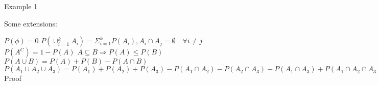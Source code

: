 \documentclass[12 pt]{article}
\newcommand{\cupinfty}[0]{\cup_{i=1}^{\infty}A_i}
\newcommand{\cupinftyup}[1]{\cup_{i=1}^{#1}A_i}
\newcommand{\capinfty}[0]{\cap_{i=1}^{\infty}A_i}
\newcommand{\limitinfty}[0]{\lim_{n \rightarrow \infty}A_n}
\newcommand{\mathcomment}[1]{\qquad\color{blue}{\(#1\)}}
\newcommand{\comment}[1]{}
\begin{document}
			Example 1
			\comment{
			\begin{align} \text{Let } A_k & = \braces{x \mid 1 < x \le 2 - \dfrac{1}{k}} \ A_1 & = \braces{x \mid 1 < x \le 2 - \dfrac{1}{1}} \ A_2 & = \braces{x \mid 1 < x \le 2 - \dfrac{1}{2}} \ & ... \end{align}
			
			Note that the sequence is non-decreasing.
			
			$\limitinfty = \cupinfty = \braces{x \mid 1 < x < 2}$
			
			Note that $x < 2$ is open
			
			Example 2
			
			$A_k = \braces{x \mid 1 < x \le x + \dfrac{1}{k}}$
			
			Note that the sequence is non-increasing.
			
			$\limitinfty = \capinfty = \braces{x \mid 1 < x \le 1} = \emptyset$
			
			Note that $x \le 1$ is still closed.
			
			1.4 Partition & Inequalities
			Partition - sequence of mutually exclusive sets which together form the whole. More formally:
			
			Let $\braces{A_i}_{i = 1}^{\infty (k)}$ be a sequence of sets
			
			$A_i \le \Omega, \forall i$
			
			If $A_i \cap A_j = \emptyset, \forall i \ne j$ and $\cupinftyup{\infty (k)} = \Omega$
			then $\braces{A_i}_{i=1}^{\infty (k)}$ is a partition of sample space $\Omega$
			
			Note - if $B$ is any subset of $\Omega$ & $\braces{A_1, ..., A_k}$ is a partition of $\Omega \Rightarrow B = \cupinftyup{k} (A_i \cap B)$
			
			Theorem 1. Kolmogorov Probability Measure
			Let $F$ be a set that collects possible sets from $\Omega$
			
			P: $F \rightarrow R^+$ is called a probability measure if
			
			a. $P(A) \ge 0 \quad \forall A \in F \mathcomment{\text{non-negative}}$
			b. $P(\Omega) = 1$
			c. $P(\cupinfty) = \Sigma_{i=1}^{\infty} P(A_i), A_i \cap A_j = \emptyset \quad \forall i \ne j$
		}
			Some extensions:
			
			$P(\phi) = 0$
			$P(\cupinftyup{k}) = \Sigma_{i=1}^{k} P(A_i), A_i \cap A_j = \emptyset \quad \forall i \ne j$
			$P(A^C) = 1 - P(A)$
			$A \subseteq B \Rightarrow P(A) \le P(B)$
			$P(A \cup B) = P(A) + P(B) - P(A \cap B)$
			$P(A_1 \cup A_2 \cup A_3) = P(A_1) + P(A_2) + P(A_3) - P(A_1 \cap A_2) - P(A_2 \cap A_3) - P(A_1 \cap A_3) + P(A_1 \cap A_2 \cap A_3)$
			Proof
			
\end{document}
